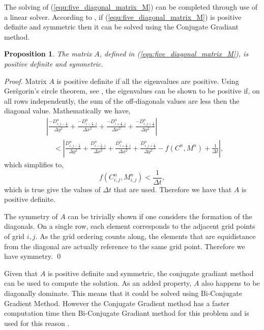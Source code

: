 \documentclass{article}
\theoremstyle{plain}
\newtheorem{prop}[thm]{Proposition}
\begin{document}
  The solving of (\ref{equ:five_diagonal_matrix_M}) can be completed through use of a linear solver. 
  According to \cite{barret1987templates}, if (\ref{equ:five_diagonal_matrix_M}) is positive definite and symmetric then it can be solved using the Conjugate Gradiant method.
  \begin{prop}
    The matrix $A$, defined in (\ref{equ:five_diagonal_matrix_M}), is positive definite and symmetric.
  \end{prop}
  \begin{proof}
    Matrix $A$ is positive definite if all the eigenvalues are positive. 
    Using Ger{\v s}gorin's circle theorem, see \cite{gerschgorin1931uber_die_abgrenzung}, the eigenvalues can be shown to be positive if, on all rows independently, the sum of the off-diagonals values are less then the diagonal value.
    Mathematically we have,
    \begin{equation}
      \begin{aligned}
      & \left| \frac{-D^n_{i,j-\frac{1}{2}}}{\Delta y ^2} + \frac{-D^n_{i-\frac{1}{2},j}}{\Delta x ^2} + \frac{-D^n_{i+\frac{1}{2},j}}{\Delta x ^2} + \frac{-D^n_{i,j+\frac{1}{2}}}{\Delta y ^2} \right| \\
      &\quad < \left| \frac{D^n_{i,j-\frac{1}{2}}}{\Delta y ^2} + \frac{D^n_{i-\frac{1}{2},j}}{\Delta x ^2} + \frac{D^n_{i+\frac{1}{2},j}}{\Delta x ^2} + \frac{D^n_{i,j+\frac{1}{2}}}{\Delta y ^2} - f(C^n, M^n) + \frac{1}{\Delta t} \right|, 
      \end{aligned}
    \end{equation}
    which simplifies to,
    \begin{equation}
      f(C^n_{i,j}, M^n_{i,j}) < \frac{1}{\Delta t},
    \end{equation}
    which is true give the values of $\Delta t$ that are used. Therefore we have that $A$ is positive definite.

    The symmetry of $A$ can be trivially shown if one considers the formation of the diagonals.
    On a single row, each element corresponds to the adjacent grid points of grid $i,j$.
    As the grid ordering counts along, the elements that are equidistance from the diagonal are actually reference to the same grid point. 
    Therefore we have symmetry. \qed
  \end{proof} 

  Given that $A$ is positive definite and symmetric, the conjugate gradiant method can be used to compute the solution.
  As an added property, $A$ also happens to be diagonally dominate.
  This means that it could be solved using Bi-Conjugate Gradient Method.
  However the Conjugate Gradient method has a faster computation time then Bi-Conjugate Gradiant method for this problem and is used for this reason \cite{barret1987templates}.
\end{document}
